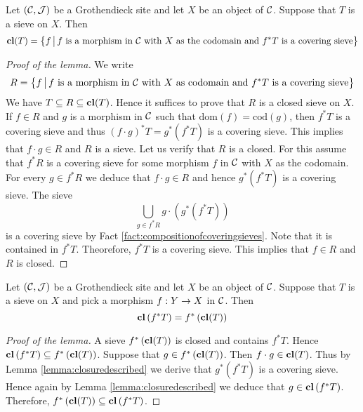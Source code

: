 \begin{lemma}\label{lemma:closuredescribed}
Let $({\mathcal C},{\mathcal J})$ be a Grothendieck site and let $X$ be an object of ${\mathcal C}$. Suppose that $T$ is a sieve on $X$. Then
$$\mathbf{cl}(T) = \big\{f\,\big|\,f\mbox{ is a morphism in }{\mathcal C}\mbox{ with }X\mbox{ as the codomain and }f^*T\mbox{ is a covering sieve}\big\}$$
\end{lemma}
\begin{proof}[Proof of the lemma]
We write
$$R = \big\{f\,\big|\,f\mbox{ is a morphism in }{\mathcal C}\mbox{ with }X\mbox{ as codomain and }f^*T\mbox{ is a covering sieve}\big\}$$
We have $T\subseteq R\subseteq \mathbf{cl}(T)$. Hence it suffices to prove that $R$ is a closed sieve on $X$. If $f\in R$ and $g$ is a morphism in ${\mathcal C}$ such that $\mathrm{dom}(f) = \mathrm{cod}(g)$, then $f^*T$ is a covering sieve and thus $(f\cdot g)^*T = g^*\left(f^*T\right)$ is a covering sieve. This implies that $f\cdot g\in R$ and $R$ is a sieve. Let us verify that $R$ is a closed. For this assume that $f^*R$ is a covering sieve for some morphism $f$ in ${\mathcal C}$ with $X$ as the codomain. For every $g\in f^*R$ we deduce that $f\cdot g\in R$ and hence $g^*\left(f^*T\right)$ is a covering sieve. The sieve
$$\bigcup_{g\in f^*R}g\cdot \left(g^*\left(f^*T\right)\right)$$
is a covering sieve by Fact \ref{fact:compositionofcoveringsieves}. Note that it is contained in $f^*T$. Theorefore, $f^*T$ is a covering sieve. This implies that $f\in R$ and $R$ is closed.
\end{proof}

\begin{lemma}\label{lemma:pullbackofclosureisclosure}
Let $({\mathcal C},{\mathcal J})$ be a Grothendieck site and let $X$ be an object of ${\mathcal C}$. Suppose that $T$ is a sieve on $X$ and pick a morphism $f:Y\rightarrow X$ in ${\mathcal C}$. Then
$$\mathbf{cl}\left(f^*T\right) = f^*\left(\mathbf{cl}(T)\right)$$
\end{lemma}
\begin{proof}[Proof of the lemma]
A sieve $f^*\left(\mathbf{cl}(T)\right)$ is closed and contains $f^*T$. Hence $\mathbf{cl}\left(f^*T\right)\subseteq f^*\left(\mathbf{cl}(T)\right)$. Suppose that $g\in f^*\left(\mathbf{cl}(T)\right)$. Then $f\cdot g \in \mathbf{cl}(T)$. Thus by Lemma \ref{lemma:closuredescribed} we derive that $g^*\left(f^*T\right)$ is a covering sieve. Hence again by Lemma \ref{lemma:closuredescribed} we deduce that $g\in \mathbf{cl}\left(f^*T\right)$. Therefore, $f^*\left(\mathbf{cl}(T)\right)\subseteq \mathbf{cl}\left(f^*T\right)$.
\end{proof}

